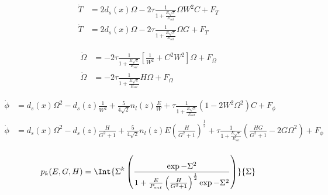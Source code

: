 \begin{equation}
\begin{split}
 \dot{T} &= 2d_{s}(x) \Omega - 2 \tau \frac{1}{1+\frac{E\sqrt{\pi}}{E_{sat}}} \Omega W^2 C+ F_T \\
 \dot{T} &= 2d_{s}(x) \Omega - 2 \tau \frac{1}{1+\frac{E\sqrt{\pi}}{E_{sat}}} \Omega G + F_T 
\end{split}
\end{equation}

\begin{equation}
\begin{split}
 \dot{\Omega} & = -2\tau \frac{1}{1+\frac{E\sqrt{\pi}}{E_{sat}}} \left[\frac{1}{W^2} + C^2 W^2 \right] \Omega + F_\Omega \\
 \dot{\Omega} & = -2\tau \frac{1}{1+\frac{E\sqrt{\pi}}{E_{sat}}} H \Omega + F_\Omega 
\end{split}
\end{equation}

\begin{equation}
\begin{split}
\dot{\phi} &= d_{s}(x) \Omega^2 - d_{s}(z) \frac{1}{W^2}  + \frac{5}{4\sqrt{2}}n_{l}(z)  \frac{E}{W} + \tau \frac{1}{1+\frac{E\sqrt{\pi}}{E_{sat}}} \left( 1- 2W^2 \Omega^2  \right)C + F_{\phi} \\
\dot{\phi} &= d_{s}(x) \Omega^2 - d_{s}(z) \frac{H}{G^2+1}  + \frac{5}{4\sqrt{2}}n_{l}(z)E  \left(\frac{H}{G^2+1}\right)^{\frac{1}{2}} + \tau \frac{1}{1+\frac{E\sqrt{\pi}}{E_{sat}}} \left( \frac{HG}{G^2+1} - 2G\Omega^2  \right) + F_{\phi} \\
\end{split}
\end{equation}

\begin{equation}
\begin{split}
p_k(E,G,H) = \Int{\Sigma^k \left(\frac{ \exp{-\Sigma^2} }{1+\frac{E}{P_{sat}}\left(\frac{H}{G^2+1}\right)^{\frac{1}{2}}\exp{-\Sigma^2}}\right)}{\Sigma} \\
\end{split}
\end{equation}

